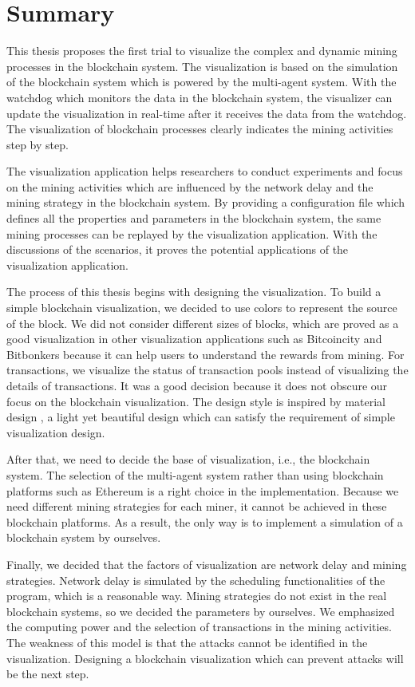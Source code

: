 \section{Summary}

This thesis proposes the first trial to visualize the complex and dynamic mining processes in the blockchain system. The visualization is based on the simulation of the blockchain system which is powered by the multi-agent system. With the watchdog which monitors the data in the blockchain system, the visualizer can update the visualization in real-time after it receives the data from the watchdog. The visualization of blockchain processes clearly indicates the mining activities step by step. 

The visualization application helps researchers to conduct experiments and focus on the mining activities which are influenced by the network delay and the mining strategy in the blockchain system. By providing a configuration file which defines all the properties and parameters in the blockchain system, the same mining processes can be replayed by the visualization application. With the discussions of the scenarios, it proves the potential applications of the visualization application.

The process of this thesis begins with designing the visualization. To build a simple blockchain visualization, we decided to use colors to represent the source of the block. We did not consider different sizes of blocks, which are proved as a good visualization in other visualization applications such as Bitcoincity and Bitbonkers because it can help users to understand the rewards from mining. For transactions, we visualize the status of transaction pools instead of visualizing the details of transactions. It was a good decision because it does not obscure our focus on the blockchain visualization. The design style is inspired by material design \cite{material}, a light yet beautiful design which can satisfy the requirement of simple visualization design.

After that, we need to decide the base of visualization, i.e., the blockchain system. The selection of the multi-agent system rather than using blockchain platforms such as Ethereum is a right choice in the implementation. Because we need different mining strategies for each miner, it cannot be achieved in these blockchain platforms. As a result, the only way is to implement a simulation of a blockchain system by ourselves.

Finally, we decided that the factors of visualization are network delay and mining strategies. Network delay is simulated by the scheduling functionalities of the program, which is a reasonable way. Mining strategies do not exist in the real blockchain systems, so we decided the parameters by ourselves. We emphasized the computing power and the selection of transactions in the mining activities. The weakness of this model is that the attacks cannot be identified in the visualization. Designing a blockchain visualization which can prevent attacks will be the next step.

